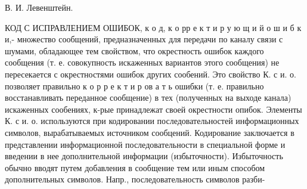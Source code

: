 \documentclass[10pt]{article}
\begin{document}
В. И. Левенштейн.



КОД С ИСПРАВЛЕНИЕМ ОШИБОК, к о д, к о рр е к т и р у ю щ и й о ш и б к и,- множество сообщений, предназначенных для передачи по каналу связи с шумами, обладающее тем свойством, что окрестность ошибок каждого сообщения (т. е. совокупность искаженных вариантов этого сообщения) не пересекается с окрестностями ошибок других сообений. Это свойство К. с и. о. позволяет правильно к о р р е к т и р ов а т ь ошибки (т. е. правильно восстанавливать переданное сообщение) в тех (полученных на выходе канала) искаженных сообениях, к-рые принадлежат своей окрестности опибок. Элементы К. с и. о. используются при кодировании последовательностей информационных символов, вырабатываемых источником сообцений. Кодирование заключается в представлении информационной последовательности в специальной форме и введении в нее дополнительной информации (избыточности). Избыточность обычно вводят путем добавления в сообщение тем или иным способом дополнительных символов. Напр., последовательность символов разби-
\end{document}
